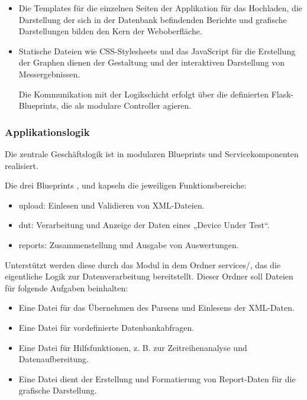 \begin{itemize}

\item
Die Templates für die einzelnen Seiten der Applikation für das Hochladen, die Darstellung der sich in der Datenbank befindenden Berichte
und grafische Darstellungen bilden den Kern der Weboberfläche.

\item
Statische Dateien wie CSS-Stylesheets und das JavaScript für die Erstellung der Graphen dienen der Gestaltung und der
interaktiven Darstellung von Messergebnissen.

Die Kommunikation mit der Logikschicht erfolgt über die definierten Flask-Blueprints, die als modulare Controller agieren.

\end{itemize}

\subsubsection{Applikationslogik}

Die zentrale Geschäftslogik ist in modularen Blueprints und Servicekomponenten realisiert.

Die drei Blueprints ,  und  kapseln die jeweiligen Funktionsbereiche:

\begin{itemize}

\item
upload: Einlesen und Validieren von XML-Dateien.

\item
dut: Verarbeitung und Anzeige der Daten eines „Device Under Test“.

\item
reports: Zusammenstellung und Ausgabe von Auswertungen.

\end{itemize}

Unterstützt werden diese durch das Modul in dem Ordner services/, das die eigentliche Logik zur Datenverarbeitung bereitstellt.
Dieser Ordner soll Dateien für folgende Aufgaben beinhalten:

\begin{itemize}

\item
Eine Datei für das Übernehmen des Parsens und Einlesens der XML-Daten.

\item
Eine Datei für vordefinierte Datenbankabfragen.

\item
Eine Datei für Hilfsfunktionen, z. B. zur Zeitreihenanalyse und Datenaufbereitung.

\item
Eine Datei dient der Erstellung und Formatierung von Report-Daten für die grafische Darstellung.

\end{itemize}

